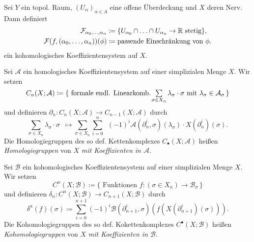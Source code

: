 \documentclass{cheat-sheet}
\newcommand{\nspace}[1]{\foreach \i in {1,...,#1}{ \! }} %
\begin{document}

\begin{bsp}
  Sei $Y$ ein topol. Raum, $(U_\alpha)_{\alpha \in A}$ eine offene Überdeckung und $X$ deren Nerv. Dann definiert
  \begin{align*}
    \mathcal{F}_{\alpha_0, \ldots, \alpha_n} & \coloneqq \{ U_{\alpha_0} \cap \ldots \cap U_{\alpha_n} \to \mathbb{R} \text{ stetig} \}, \\
    \mathcal{F}(f, (\alpha_0, \ldots, \alpha_n))(\phi) & \coloneqq \text{passende Einschränkung von $\phi$}.
  \end{align*}
  ein kohomologisches Koeffizientensystem auf $X$.
\end{bsp}


\begin{defn}
  Sei $\mathcal{A}$ ein homologisches Koeffizientensystem auf einer simplizialen Menge $X$. Wir setzen
  \[ C_n(X; \mathcal{A}) \coloneqq \{ \text{ formale endl. Linearkomb. } \nspace{3} \sum_{\sigma \in X_n} \lambda_\sigma \cdot \sigma \text{ mit } \lambda_\sigma \in \mathcal{A}_\sigma \, \} \]
  und definieren $\partial_n : C_n(X; \mathcal{A}) \to C_{n-1}(X; \mathcal{A})$ durch
  \[ \sum_{\sigma \in X_n} \lambda_\sigma \cdot \sigma \enspace \mapsto \sum_{\sigma \in X_n} \sum_{i=0}^n \enspace (-1)^i \mathcal{A}(\partial_n^i, \sigma)(\lambda_\sigma) \cdot X(\partial_n^i)(\sigma). \]
  Die Homologiegruppen des so def. Kettenkomplexes $C_\bullet(X; \mathcal{A})$ heißen \emph{Homologiegruppen} von $X$ \emph{mit Koeffizienten in $\mathcal{A}$}.
\end{defn}

\begin{defn}
  Sei $\mathcal{B}$ ein kohomologisches Koeffizientensystem auf einer simplizialen Menge $X$. Wir setzen
  \[ C^n(X; \mathcal{B}) \coloneqq \{ \text{ Funktionen } f : (\sigma \in X_n) \to \mathcal{B}_\sigma \, \} \]
  und definieren $\delta_n : C^n(X; \mathcal{B}) \to C_{n+1}(X; \mathcal{B})$ durch
  \[ \delta^n(f)(\sigma) \coloneqq \sum_{i=0}^{n+1} (-1)^i \mathcal{B}(\partial_{n+1}^i, \sigma)(f(X(\partial_{n+1}^i)(\sigma))). \]
  Die Kohomologiegruppen des so def. Kokettenkomplexes $C^\bullet(X; \mathcal{B})$ heißen \emph{Kohomologiegruppen} von $X$ \emph{mit Koeffizienten in $\mathcal{B}$}.
\end{defn}
\end{document}
